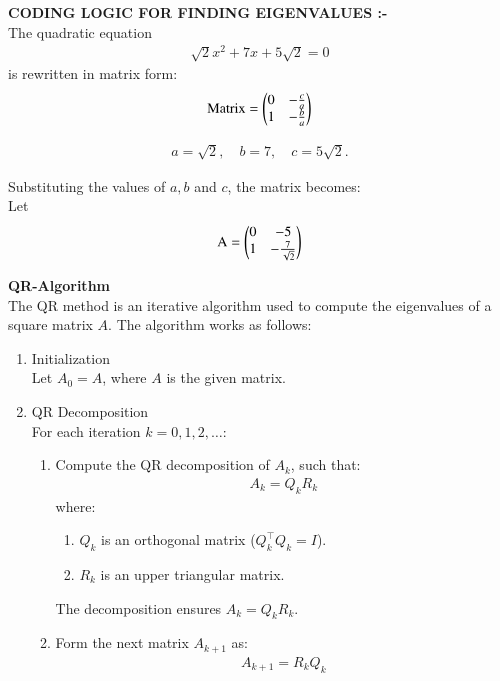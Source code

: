 \documentclass[journal]{IEEEtran}
\numberwithin{equation}{enumi}
\numberwithin{figure}{enumi}
\begin{document}
\begin{enumerate}
\textbf{CODING LOGIC FOR FINDING EIGENVALUES :-}\\


The quadratic equation 
\begin{align}
\sqrt{2}x^2 + 7x + 5\sqrt{2} = 0
\end{align}
is rewritten in matrix form:
\begin{align}
\text{Matrix} =
\begin{pmatrix}0 & -\frac{c}{a} \\
1 & -\frac{b}{a}
\end{pmatrix}
\end{align}

\begin{align}
a = \sqrt{2}, \quad b = 7, \quad c = 5\sqrt{2}.
\end{align}

Substituting the values of $a,b$ and $c$, the matrix becomes:\\
Let
\begin{align}
\text{A} =
\begin{pmatrix}0 & -5 \\
1 & -\frac{7}{\sqrt{2}}
\end{pmatrix}
\end{align}




\textbf{QR-Algorithm}\\
The QR method is an iterative algorithm used to compute the eigenvalues of a square matrix $A$. The algorithm works as follows:
\begin{enumerate}
\item Initialization \\
Let $A_0 = A $, where $A$ is the given matrix.

\item QR Decomposition \\
For each iteration $ k = 0, 1, 2, \dots $:
\begin{enumerate}
    \item Compute the QR decomposition of \( A_k \), such that:
    \begin{align}
    A_k = Q_k R_k
    \end{align}
    where:
    \begin{enumerate}
        \item $Q_k $ is an orthogonal matrix ($ Q_k^\top Q_k = I $).
        \item $ R_k $ is an upper triangular matrix.
    \end{enumerate}
    The decomposition ensures $ A_k = Q_k R_k $.

    \item Form the next matrix \( A_{k+1} \) as:
    \begin{align}
    A_{k+1} = R_k Q_k
    \end{align}
\end{enumerate}


\end{enumerate}
\end{enumerate}
\end{document}
